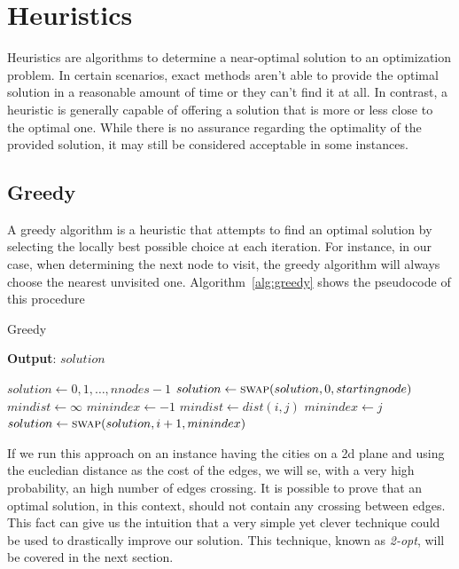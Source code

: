 \documentclass{article}
\begin{document}
\section{Heuristics}
Heuristics are algorithms to determine a near-optimal solution to an optimization problem. In certain scenarios,
exact methods aren't able to provide the optimal solution in a reasonable amount of time or they can't find it
at all. In contrast, a heuristic is generally capable of offering a solution that is more or less close to
the optimal one.
While there is no assurance regarding the optimality of the provided solution, it may still be considered
acceptable in some instances.

\subsection{Greedy}
A greedy algorithm is a heuristic that attempts to find an optimal solution by selecting the locally best possible choice at each iteration.
For instance, in our case, when determining the next node to visit, the greedy algorithm will always choose
the nearest unvisited one. Algorithm~\ref{alg:greedy} shows the pseudocode of this procedure

\begin{algorithm}[ht]
\caption{Greedy}
\label{alg:greedy}
\hspace*{0.5em} \textbf{Output}: $solution$
\begin{algorithmic}
	\State $solution \gets {0, 1, \dots, nnodes - 1}$
	\State $solution \gets \Call{swap}{solution, 0, startingnode}$
                \State $mindist \gets \infty$
                \State $minindex \gets -1$
                                \State $mindist \gets dist(i, j)$
                                \State $minindex \gets j$
                        \EndIf
                \EndFor
                \State $solution \gets \Call{swap}{solution, i + 1, minindex}$
        \EndFor
\EndProcedure
\end{algorithmic}
\end{algorithm}
If we run this approach on an instance having the cities on a 2d plane and using the
eucledian distance as the cost of the edges, we will se, with a very high probability, an
high number of edges crossing.
It is possible to prove that an optimal solution, in this context, should not contain any crossing
between edges.
This fact can give us the intuition that a very simple yet clever technique could be used
to drastically improve our solution. This technique, known as \textit{2-opt}, will be covered
in the next section.
\end{document}
